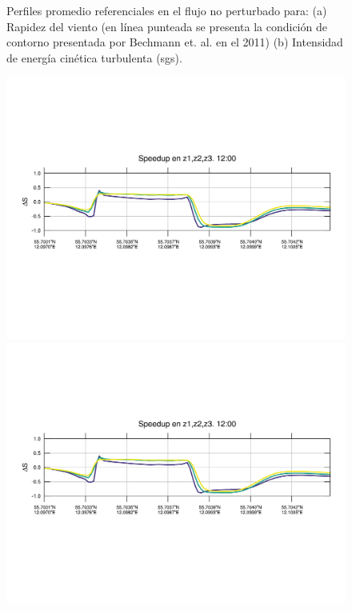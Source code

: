 \begin{figure}[H]
	
	
	\caption{Perfiles promedio referenciales en el flujo no perturbado para: (a) Rapidez del viento (en línea punteada se presenta la condición de contorno presentada por Bechmann et. al. en el 2011) (b) Intensidad de energía cinética turbulenta (sgs).}
	\label{fig:06_bol_referencia}
\end{figure}

\begin{figure}[H]
	\centering
	\includegraphics[width=0.95\linewidth,trim={12mm 84mm 10mm 74mm},page=1,clip]{Imagenes/06/bol/speedup}\\%
	\includegraphics[width=0.95\linewidth,trim={12mm 84mm 10mm 74mm},page=13,clip]{Imagenes/06/bol/speedup}\\%

\end{figure}
